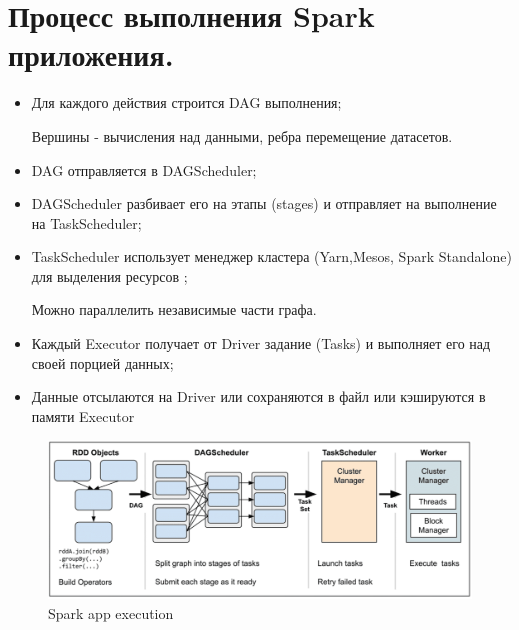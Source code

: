 \section{Процесс выполнения Spark приложения.}

\begin{itemize}
    \item Для каждого действия строится DAG выполнения;
    
    Вершины - вычисления над данными, ребра перемещение датасетов.
    \item DAG отправляется в DAGScheduler;
    \item DAGScheduler разбивает его на этапы (stages) и отправляет
    на выполнение на TaskScheduler;
    \item TaskScheduler использует менеджер кластера (Yarn,Mesos,
    Spark Standalone) для выделения ресурсов ;

    Можно параллелить независимые части графа.
    \item Каждый Executor получает от Driver задание (Tasks) и
    выполняет его над своей порцией данных;
    \item Данные отсылаются на Driver или сохраняются в файл или
    кэшируются в памяти Executor
\end{itemize}

\begin{figure}[H]
	\centering
	\begin{minipage}[b]{0.8\textwidth}
		\includegraphics[width=\textwidth]{images/sparkapp.png}
		\caption{Spark app execution}
	\end{minipage}
\end{figure}
